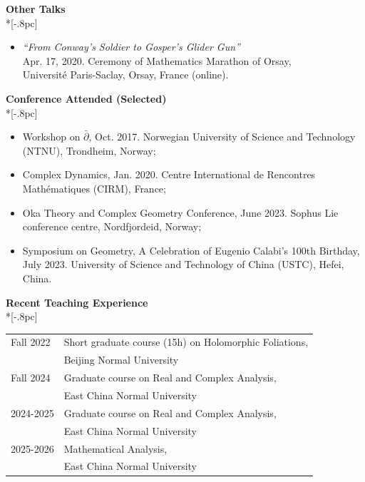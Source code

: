 \documentclass[12pt]{article}
\begin{document}
{\large \bf Other Talks} \\*[-.8pc]
\underline{\hspace{6.6in}} \\
\vspace{-0.7cm}
\begin{itemize}
\item {\em ``From Conway's Soldier to Gosper's Glider Gun''}\\
Apr. 17, 2020. Ceremony of Mathematics Marathon of Orsay,\\
 Universit\'{e} Paris-Saclay, Orsay, France (online).
\end{itemize}

{\large \bf Conference Attended (Selected)} \\*[-.8pc]
\underline{\hspace{6.6in}} \\
\vspace{-0.7cm}
\begin{itemize}
\item Workshop on $\bar{\partial}$, Oct. 2017. Norwegian University of Science and Technology (NTNU), Trondheim, Norway;

\vspace{-0.2cm}

\item Complex Dynamics, Jan. 2020. Centre International de Rencontres Math\'{e}matiques (CIRM), France;

\vspace{-0.2cm}

\item Oka Theory and Complex Geometry Conference, June 2023. Sophus Lie conference centre, Nordfjordeid, Norway;

\vspace{-0.2cm}

\item Symposium on Geometry, A Celebration of Eugenio Calabi's 100th Birthday, July 2023. University of Science and Technology of China (USTC), Hefei, China.

\end{itemize}


{\large \bf Recent Teaching Experience} \\*[-.8pc]
\underline{\hspace{6.6in}} \\
\begin{tabular}{ll}

Fall 2022 & Short graduate course (15h) on Holomorphic Foliations,\\
& Beijing Normal University\\

Fall 2024 & Graduate course on Real and Complex Analysis,\\
& East China Normal University\\

2024-2025 & Graduate course on Real and Complex Analysis,\\
& East China Normal University\\

2025-2026 & Mathematical Analysis,\\
& East China Normal University
\end{tabular}
\end{document}
